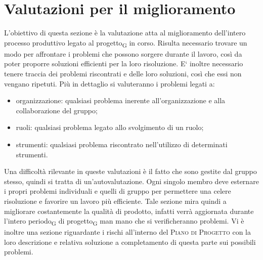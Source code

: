 \section{Valutazioni per il miglioramento}
L'obiettivo di questa sezione è la valutazione atta al miglioramento dell'intero processo produttivo legato al progetto\textsubscript{G} in corso. Risulta necessario trovare un modo per affrontare i problemi che possono sorgere durante il lavoro, così da poter proporre soluzioni efficienti per la loro risoluzione. E` inoltre necessario tenere traccia dei problemi riscontrati e delle loro soluzioni, così che essi non vengano ripetuti.
Più in dettaglio si valuteranno i problemi legati a:
\begin{itemize}
    \item organizzazione: qualsiasi problema inerente all'organizzazione e alla collaborazione del gruppo;
    \item ruoli: qualsiasi problema legato allo svolgimento di un ruolo;
    \item strumenti: qualsiasi problema riscontrato nell'utilizzo di determinati strumenti.
\end{itemize}

Una difficoltà rilevante in queste valutazioni è il fatto che sono gestite dal gruppo stesso, quindi si tratta di un'autovalutazione. Ogni singolo membro deve esternare i propri problemi individuali e quelli di gruppo per permettere una celere risoluzione e favorire un lavoro più efficiente.
Tale sezione mira quindi a migliorare costantemente la qualità di prodotto, infatti verrà aggiornata durante l'intero periodo\textsubscript{G} di progetto\textsubscript{G} man mano che si verificheranno problemi.
Vi è inoltre una sezione riguardante i  rischi all'interno del \textsc{Piano di Progetto} con la loro descrizione e relativa soluzione a completamento di questa parte sui possibili problemi.
